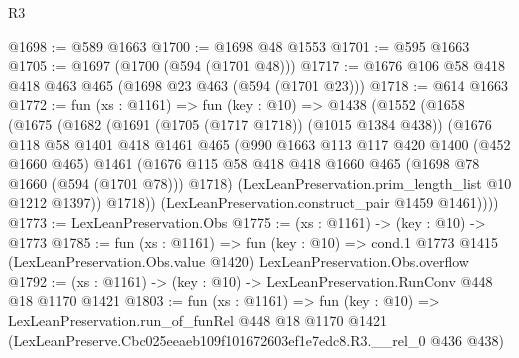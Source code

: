 \begin{lexlean}{R3}
\begin{coremodule}
@1698 := @589 @1663
@1700 := @1698 @48 @1553
@1701 := @595 @1663
@1705 := @1697 (@1700 (@594 (@1701 @48)))
@1717 := @1676 @106 @58 @418 @418 @463 @465 (@1698 @23 @463 (@594 (@1701 @23)))
@1718 := @614 @1663
@1772 := fun (xs : @1161) =>
  fun (key : @10) =>
  @1438
    (@1552
      (@1658
        (@1675
          (@1682
            (@1691 (@1705 (@1717 @1718)) (@1015 @1384 @438))
            (@1676
              @118
              @58
              @1401
              @418
              @1461
              @465
              (@990
                @1663
                @113
                @117
                @420
                @1400
                (@452 @1660 @465)
                @1461
                (@1676 @115 @58 @418 @418 @1660 @465 (@1698 @78 @1660 (@594 (@1701 @78))) @1718)
                (LexLeanPreservation.prim_length_list @10 @1212 @1397))
              @1718))
          (LexLeanPreservation.construct_pair @1459 @1461))))
@1773 := LexLeanPreservation.Obs
@1775 := (xs : @1161) -> (key : @10) -> @1773
@1785 := fun (xs : @1161) =>
  fun (key : @10) =>
  cond.{1} @1773 @1415 (LexLeanPreservation.Obs.value @1420) LexLeanPreservation.Obs.overflow
@1792 := (xs : @1161) -> (key : @10) -> LexLeanPreservation.RunConv @448 @18 @1170 @1421
@1803 := fun (xs : @1161) =>
  fun (key : @10) =>
  LexLeanPreservation.run_of_funRel
    @448
    @18
    @1170
    @1421
    (LexLeanPreserve.Cbc025eeaeb109f101672603ef1e7edc8.R3.__rel_0 @436 @438)
\end{coremodule}
\end{lexlean}
